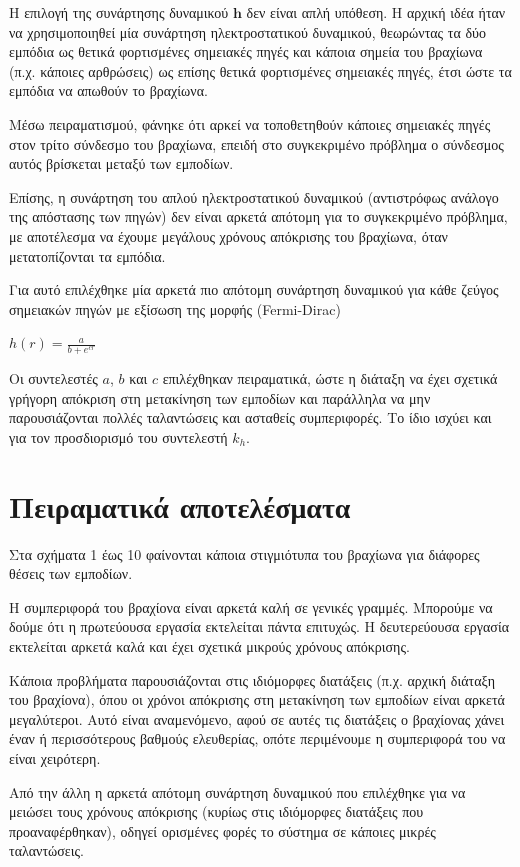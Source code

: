 \documentclass[a4paper, 11pt, english, greek]{article}
\begin{document}
Η επιλογή της συνάρτησης δυναμικού $\mathbf{h}$ δεν είναι απλή υπόθεση.
Η αρχική ιδέα ήταν να χρησιμοποιηθεί μία συνάρτηση ηλεκτροστατικού δυναμικού, θεωρώντας τα δύο εμπόδια
ως θετικά φορτισμένες σημειακές πηγές και κάποια σημεία του βραχίωνα (π.χ. κάποιες αρθρώσεις) ως επίσης
θετικά φορτισμένες σημειακές πηγές, έτσι ώστε τα εμπόδια να απωθούν το βραχίωνα.

Μέσω πειραματισμού, φάνηκε ότι αρκεί να τοποθετηθούν κάποιες σημειακές πηγές στον τρίτο σύνδεσμο του βραχίωνα,
επειδή στο συγκεκριμένο πρόβλημα ο σύνδεσμος αυτός βρίσκεται μεταξύ των εμποδίων.

Επίσης, η συνάρτηση του απλού ηλεκτροστατικού δυναμικού (αντιστρόφως ανάλογο της απόστασης των πηγών)
δεν είναι αρκετά απότομη για το συγκεκριμένο πρόβλημα, με αποτέλεσμα να έχουμε μεγάλους χρόνους απόκρισης του
βραχίωνα, όταν μετατοπίζονται τα εμπόδια.

Για αυτό επιλέχθηκε μία αρκετά πιο απότομη συνάρτηση δυναμικού για κάθε ζεύγος σημειακών πηγών
με εξίσωση της μορφής (\textlatin{Fermi-Dirac})

\begin{center}
	$h(r) = \frac{\displaystyle a}{\displaystyle b + e^{c r}}$
\end{center}
Οι συντελεστές $a$, $b$ και $c$ επιλέχθηκαν πειραματικά, ώστε η διάταξη να έχει σχετικά γρήγορη απόκριση
στη μετακίνηση των εμποδίων και παράλληλα να μην παρουσιάζονται πολλές ταλαντώσεις και ασταθείς συμπεριφορές.
Το ίδιο ισχύει και για τον προσδιορισμό του συντελεστή $k_{h}$.

\section{Πειραματικά αποτελέσματα}
Στα σχήματα 1 έως 10 φαίνονται κάποια στιγμιότυπα του βραχίωνα για διάφορες θέσεις των εμποδίων.

Η συμπεριφορά του βραχίονα είναι αρκετά καλή σε γενικές γραμμές.
Μπορούμε να δούμε ότι η πρωτεύουσα εργασία εκτελείται πάντα επιτυχώς.
Η δευτερεύουσα εργασία εκτελείται αρκετά καλά και έχει σχετικά μικρούς χρόνους απόκρισης.

Κάποια προβλήματα παρουσιάζονται στις ιδιόμορφες διατάξεις (π.χ. αρχική διάταξη του βραχίονα), όπου
οι χρόνοι απόκρισης στη μετακίνηση των εμποδίων είναι αρκετά μεγαλύτεροι.
Αυτό είναι αναμενόμενο, αφού σε αυτές τις διατάξεις ο βραχίονας χάνει έναν ή περισσότερους βαθμούς
ελευθερίας, οπότε περιμένουμε η συμπεριφορά του να είναι χειρότερη.

Από την άλλη η αρκετά απότομη συνάρτηση δυναμικού που επιλέχθηκε για να μειώσει τους χρόνους απόκρισης
(κυρίως στις ιδιόμορφες διατάξεις που προαναφέρθηκαν),
οδηγεί ορισμένες φορές το σύστημα σε κάποιες μικρές ταλαντώσεις.
\end{document}
